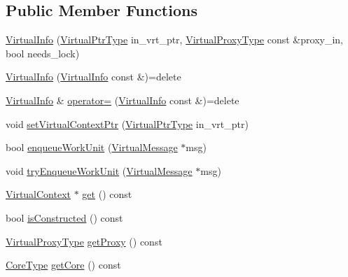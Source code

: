 \subsection*{Public Member Functions}
\begin{DoxyCompactItemize}
\item 
\hyperlink{structvt_1_1vrt_1_1_virtual_info_a8c6544976bd8778afc357ee3e14b0e07}{Virtual\+Info} (\hyperlink{structvt_1_1vrt_1_1_virtual_info_aede28e76785423dd2685fe4cf54afa21}{Virtual\+Ptr\+Type} in\+\_\+vrt\+\_\+ptr, \hyperlink{namespacevt_a1b417dd5d684f045bb58a0ede70045ac}{Virtual\+Proxy\+Type} const \&proxy\+\_\+in, bool needs\+\_\+lock)
\item 
\hyperlink{structvt_1_1vrt_1_1_virtual_info_a783d8ff575a96a42e5f1275e0b4ea1c8}{Virtual\+Info} (\hyperlink{structvt_1_1vrt_1_1_virtual_info}{Virtual\+Info} const \&)=delete
\item 
\hyperlink{structvt_1_1vrt_1_1_virtual_info}{Virtual\+Info} \& \hyperlink{structvt_1_1vrt_1_1_virtual_info_a63b12c1dfcbc3c6d34be9100c704dd81}{operator=} (\hyperlink{structvt_1_1vrt_1_1_virtual_info}{Virtual\+Info} const \&)=delete
\item 
void \hyperlink{structvt_1_1vrt_1_1_virtual_info_ab36ad072148fb10cb3c2c441488bf73d}{set\+Virtual\+Context\+Ptr} (\hyperlink{structvt_1_1vrt_1_1_virtual_info_aede28e76785423dd2685fe4cf54afa21}{Virtual\+Ptr\+Type} in\+\_\+vrt\+\_\+ptr)
\item 
bool \hyperlink{structvt_1_1vrt_1_1_virtual_info_a9e31b6696cfa2482c036f70bf7ae6285}{enqueue\+Work\+Unit} (\hyperlink{structvt_1_1vrt_1_1_virtual_message}{Virtual\+Message} $\ast$msg)
\item 
void \hyperlink{structvt_1_1vrt_1_1_virtual_info_a58cd2e2f56595ccf7ca2643fee1c8d87}{try\+Enqueue\+Work\+Unit} (\hyperlink{structvt_1_1vrt_1_1_virtual_message}{Virtual\+Message} $\ast$msg)
\item 
\hyperlink{structvt_1_1vrt_1_1_virtual_context}{Virtual\+Context} $\ast$ \hyperlink{structvt_1_1vrt_1_1_virtual_info_a7857993ff78f907fd2d95d5637cc9a87}{get} () const
\item 
bool \hyperlink{structvt_1_1vrt_1_1_virtual_info_a138ef8d178b91215ef63627b73df5ad4}{is\+Constructed} () const
\item 
\hyperlink{namespacevt_a1b417dd5d684f045bb58a0ede70045ac}{Virtual\+Proxy\+Type} \hyperlink{structvt_1_1vrt_1_1_virtual_info_aeba89cdb61c7723a35f1839479c0126f}{get\+Proxy} () const
\item 
\hyperlink{namespacevt_a74b11b22c02feaabab8591acc87c7c52}{Core\+Type} \hyperlink{structvt_1_1vrt_1_1_virtual_info_aa7975f69ba3af7f8910eb3820cc18369}{get\+Core} () const

\end{DoxyCompactItemize}
